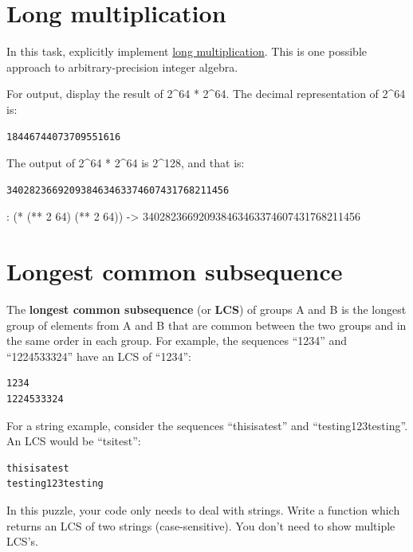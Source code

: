 \begin{itemize}
\begin{wideverbatim}
\end{wideverbatim}

\pagebreak{}
\section*{Long multiplication}

In this task, explicitly implement
\href{http://en.wikipedia.org/wiki/long\_multiplication}{long
multiplication}. This is one possible approach to arbitrary-precision
integer algebra.

For output, display the result of 2\^{}64 * 2\^{}64. The decimal
representation of 2\^{}64 is:

\begin{verbatim}
18446744073709551616
\end{verbatim}

The output of 2\^{}64 * 2\^{}64 is 2\^{}128, and that is:

\begin{verbatim}
340282366920938463463374607431768211456
\end{verbatim}

\begin{wideverbatim}

: (* (** 2 64) (** 2 64))
-> 340282366920938463463374607431768211456

\end{wideverbatim}

\pagebreak{}
\section*{Longest common subsequence}

The \textbf{longest common subsequence} (or \textbf{LCS}) of groups A
and B is the longest group of elements from A and B that are common
between the two groups and in the same order in each group. For example,
the sequences ``1234'' and ``1224533324'' have an LCS of ``1234'':

\begin{verbatim}
1234
1224533324
\end{verbatim}

For a string example, consider the sequences ``thisisatest'' and
``testing123testing''. An LCS would be ``tsitest'':

\begin{verbatim}
thisisatest
testing123testing
\end{verbatim}

In this puzzle, your code only needs to deal with strings. Write a
function which returns an LCS of two strings (case-sensitive). You don't
need to show multiple LCS's.


\end{itemize}
